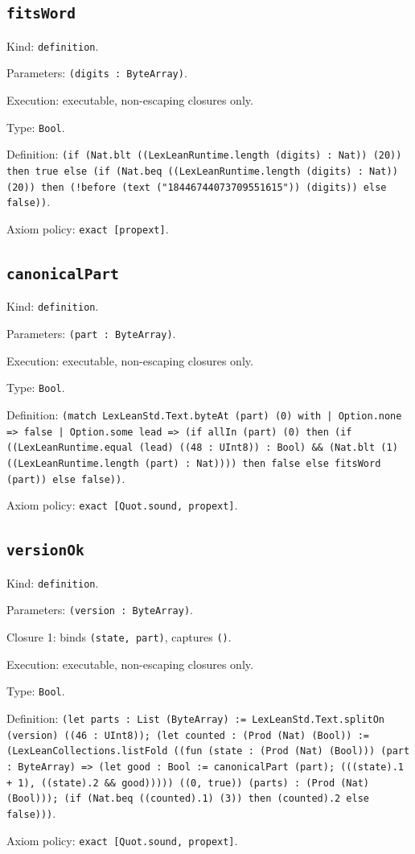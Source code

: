 \documentclass[11pt]{article}
\begin{document}
\subsection*{\texttt{fitsWord}}
\noindent Kind: \texttt{definition}.\par
\noindent Parameters: \texttt{(digits : ByteArray)}.\par
\noindent Execution: executable, non-escaping closures only.\par
\noindent Type: \texttt{Bool}.\par
\noindent Definition: \texttt{(if (Nat.blt ((LexLeanRuntime.length (digits) : Nat)) (20)) then true else (if (Nat.beq ((LexLeanRuntime.length (digits) : Nat)) (20)) then (!before (text ("18446744073709551615")) (digits)) else false))}.\par
\noindent Axiom policy: \texttt{exact [propext]}.\par
\subsection*{\texttt{canonicalPart}}
\noindent Kind: \texttt{definition}.\par
\noindent Parameters: \texttt{(part : ByteArray)}.\par
\noindent Execution: executable, non-escaping closures only.\par
\noindent Type: \texttt{Bool}.\par
\noindent Definition: \texttt{(match LexLeanStd.Text.byteAt (part) (0) with | Option.none => false | Option.some lead => (if allIn (part) (0) then (if ((LexLeanRuntime.equal (lead) ((48 : UInt8)) : Bool) \&\& (Nat.blt (1) ((LexLeanRuntime.length (part) : Nat)))) then false else fitsWord (part)) else false))}.\par
\noindent Axiom policy: \texttt{exact [Quot.sound, propext]}.\par
\subsection*{\texttt{versionOk}}
\noindent Kind: \texttt{definition}.\par
\noindent Parameters: \texttt{(version : ByteArray)}.\par
\noindent Closure 1: binds \texttt{(state, part)}, captures \texttt{()}.\par
\noindent Execution: executable, non-escaping closures only.\par
\noindent Type: \texttt{Bool}.\par
\noindent Definition: \texttt{(let parts : List (ByteArray) := LexLeanStd.Text.splitOn (version) ((46 : UInt8)); (let counted : (Prod (Nat) (Bool)) := (LexLeanCollections.listFold ((fun (state : (Prod (Nat) (Bool))) (part : ByteArray) => (let good : Bool := canonicalPart (part); (((state).1 + 1), ((state).2 \&\& good))))) ((0, true)) (parts) : (Prod (Nat) (Bool))); (if (Nat.beq ((counted).1) (3)) then (counted).2 else false)))}.\par
\noindent Axiom policy: \texttt{exact [Quot.sound, propext]}.\par
\end{document}
